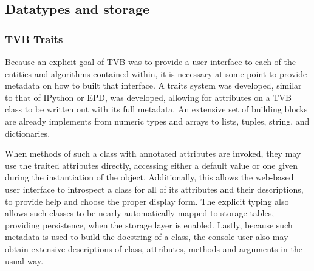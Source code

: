 %
%
%
%
%
%


\subsection{Datatypes and storage}

\subsubsection{TVB Traits}

Because an explicit goal of TVB was to provide a user interface to each of the
entities and algorithms contained within, it is necessary at some point to
provide metadata on how to built that interface. A traits system was
developed, similar to that of IPython or EPD, was developed, allowing for
attributes on a TVB class to be written out with its full metadata. An extensive
set of building blocks are already implements from numeric types and arrays to
lists, tuples, string, and dictionaries.

When methods of such a class with annotated attributes are invoked, they may use
the traited attributes directly, accessing either a default value or one given
during the instantiation of the object. Additionally, this allows the web-based
user interface to introspect a class for all of its attributes and their
descriptions, to provide help and choose the proper display form. The explicit
typing also allows such classes to be nearly automatically mapped to storage
tables, providing persistence, when the storage layer is enabled.  Lastly,
because such metadata is used to build the docstring of a class, the console
user also may obtain extensive descriptions of class, attributes, methods and
arguments in the usual way. 


